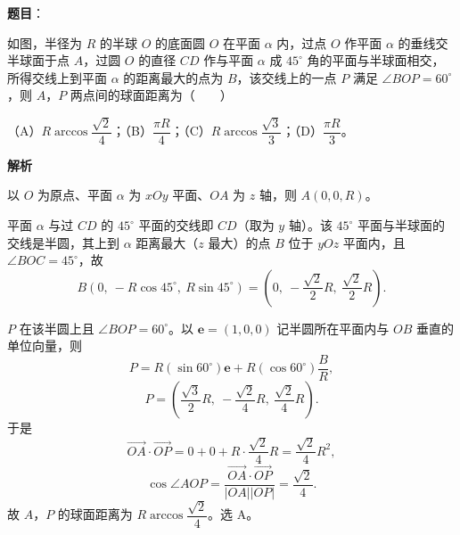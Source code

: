 \begin{answer}

\textbf{题目}：

如图，半径为 $R$ 的半球 $O$ 的底面圆 $O$ 在平面 $\alpha$ 内，过点 $O$ 作平面 $\alpha$ 的垂线交半球面于点 $A$，过圆 $O$ 的直径 $CD$ 作与平面 $\alpha$ 成 $45^\circ$ 角的平面与半球面相交，所得交线上到平面 $\alpha$ 的距离最大的点为 $B$，该交线上的一点 $P$ 满足 $\angle BOP=60^\circ$，则 $A$，$P$ 两点间的球面距离为\mbox{（　　）}
\nopagebreak[4]
\begin{center}\end{center}
\nopagebreak[4]
（A）$R\arccos\dfrac{\sqrt2}{4}$；（B）$\dfrac{\pi R}{4}$；（C）$R\arccos\dfrac{\sqrt3}{3}$；（D）$\dfrac{\pi R}{3}$。

\textbf{解析}

以 $O$ 为原点、平面 $\alpha$ 为 $xOy$ 平面、$OA$ 为 $z$ 轴，则 $A(0,0,R)$。

平面 $\alpha$ 与过 $CD$ 的 $45^\circ$ 平面的交线即 $CD$（取为 $y$ 轴）。该 $45^\circ$ 平面与半球面的交线是半圆，其上到 $\alpha$ 距离最大（$z$ 最大）的点 $B$ 位于 $yOz$ 平面内，且 $\angle BOC=45^\circ$，故
\nopagebreak[4]
\[B\left(0,\ -R\cos45^\circ,\ R\sin45^\circ\right)=\left(0,\ -\frac{\sqrt2}2R,\ \frac{\sqrt2}2R\right).\]

$P$ 在该半圆上且 $\angle BOP=60^\circ$。以 $\boldsymbol e=(1,0,0)$ 记半圆所在平面内与 $OB$ 垂直的单位向量，则
\nopagebreak[4]
\[P=R\left(\sin60^\circ\right)\boldsymbol e+R\left(\cos60^\circ\right)\frac{B}{R},\]
\nopagebreak[4]
\[P=\left(\frac{\sqrt3}2R,\ -\frac{\sqrt2}4R,\ \frac{\sqrt2}4R\right).\]
于是
\nopagebreak[4]
\[\overrightarrow{OA}\cdot\overrightarrow{OP}=0+0+R\cdot\frac{\sqrt2}4R=\frac{\sqrt2}4R^2,\]
\nopagebreak[4]
\[\cos\angle AOP=\frac{\overrightarrow{OA}\cdot\overrightarrow{OP}}{|OA||OP|}=\frac{\sqrt2}4.\]
故 $A$，$P$ 的球面距离为 $R\arccos\dfrac{\sqrt2}4$。选 A。


\end{answer}
